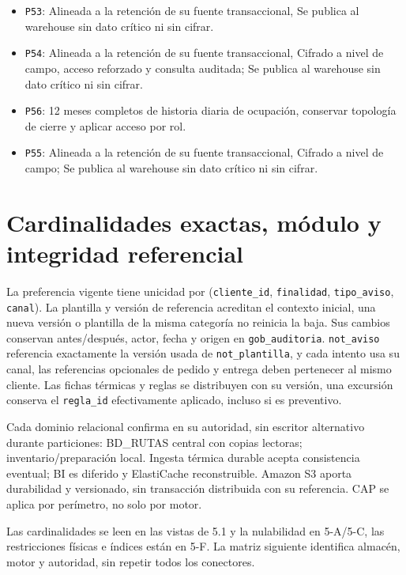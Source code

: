 \begin{itemize}
\item \texttt{P53}: Alineada a la retención de su fuente transaccional, Se publica al warehouse sin dato crítico ni sin cifrar.
\item \texttt{P54}: Alineada a la retención de su fuente transaccional, Cifrado a nivel de campo, acceso reforzado y consulta auditada; Se publica al warehouse sin dato crítico ni sin cifrar.
\item \texttt{P56}: 12 meses completos de historia diaria de ocupación, conservar topología de cierre y aplicar acceso por rol.
\item \texttt{P55}: Alineada a la retención de su fuente transaccional, Cifrado a nivel de campo; Se publica al warehouse sin dato crítico ni sin cifrar.
\end{itemize}

\section{Cardinalidades exactas, módulo y integridad referencial}
\label{anexo-5b}

La preferencia vigente tiene unicidad por (\texttt{cliente\_\allowbreak{}id}, \texttt{finalidad}, \texttt{tipo\_\allowbreak{}aviso}, \texttt{canal}). La plantilla y versión de referencia acreditan el contexto inicial, una nueva versión o plantilla de la misma categoría no reinicia la baja. Sus cambios conservan antes/después, actor, fecha y origen en \texttt{gob\_\allowbreak{}auditoria}. \texttt{not\_\allowbreak{}aviso} referencia exactamente la versión usada de \texttt{not\_\allowbreak{}plantilla}, y cada intento usa su canal, las referencias opcionales de pedido y entrega deben pertenecer al mismo cliente. Las fichas térmicas y reglas se distribuyen con su versión, una excursión conserva el \texttt{regla\_\allowbreak{}id} efectivamente aplicado, incluso si es preventivo.

Cada dominio relacional confirma en su autoridad, sin escritor alternativo durante particiones: BD\_RUTAS central con copias lectoras; inventario/preparación local. Ingesta térmica durable acepta consistencia eventual; BI es diferido y ElastiCache reconstruible. Amazon S3 aporta durabilidad y versionado, sin transacción distribuida con su referencia. CAP se aplica por perímetro, no solo por motor.

Las cardinalidades se leen en las vistas de 5.1 y la nulabilidad en 5-A/5-C, las restricciones físicas e índices están en 5-F. La matriz siguiente identifica almacén, motor y autoridad, sin repetir todos los conectores.

